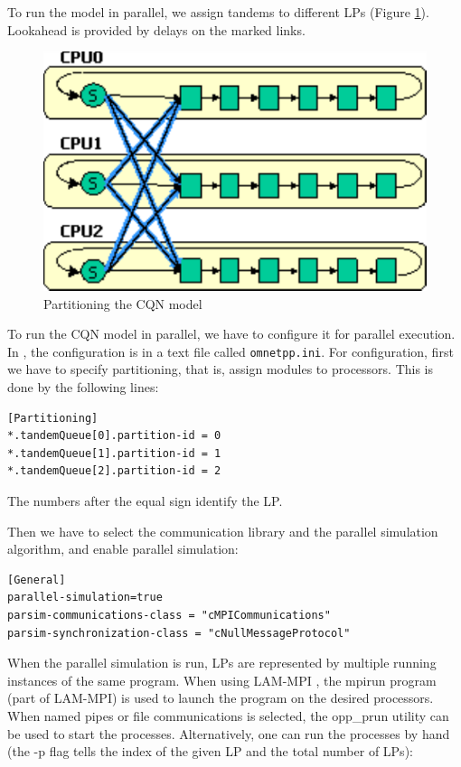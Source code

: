 To run the model in parallel, we assign tandems to different LPs
(Figure \ref{fig:cqn-partitioning}). Lookahead is provided
by delays on the marked links.

\begin{figure}[htbp]
  \begin{center}
    \includegraphics{figures/cqn-partitioning}
    \caption{Partitioning the CQN model}
    \label{fig:cqn-partitioning}
  \end{center}
\end{figure}

To run the CQN model in parallel, we have to configure it for parallel
execution. In {\opp}, the configuration is in a text file called
\texttt{omnetpp.ini}. For configuration, first we have to specify
partitioning, that is, assign modules to processors. This is done
by the following lines:

\begin{verbatim}
[Partitioning]
*.tandemQueue[0].partition-id = 0
*.tandemQueue[1].partition-id = 1
*.tandemQueue[2].partition-id = 2
\end{verbatim}

The numbers after the equal sign identify the LP.

Then we have to select the communication library and the parallel
simulation algorithm, and enable parallel simulation:

\begin{verbatim}
[General]
parallel-simulation=true
parsim-communications-class = "cMPICommunications"
parsim-synchronization-class = "cNullMessageProtocol"
\end{verbatim}

When the parallel simulation is run, LPs are represented
by multiple running instances of the same program.
When using LAM-MPI \cite{lammpi}, the mpirun program (part of LAM-MPI)
is used to launch the program on the desired processors.
When named pipes or file communications is selected, the opp\_prun
{\opp} utility can be used to start the processes.
Alternatively, one can run the processes by hand (the -p flag
tells {\opp} the index of the given LP and the total number of LPs):

